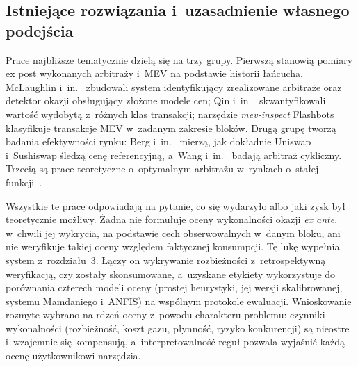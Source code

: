 \subsection{Istniejące rozwiązania i~uzasadnienie własnego podejścia}

Prace najbliższe tematycznie dzielą się na trzy grupy. Pierwszą stanowią pomiary ex post
wykonanych arbitraży i~MEV na podstawie historii łańcucha. McLaughlin
i~in.~\cite{mclaughlin_arbitrage} zbudowali system identyfikujący zrealizowane arbitraże oraz
detektor okazji obsługujący złożone modele cen; Qin i~in.~\cite{qin_bev} skwantyfikowali wartość
wydobytą z~różnych klas transakcji; narzędzie \emph{mev-inspect} Flashbots~\cite{mev_inspect}
klasyfikuje transakcje MEV w~zadanym zakresie bloków. Drugą grupę tworzą badania efektywności
rynku: Berg i~in.~\cite{berg_inefficiencies} mierzą, jak dokładnie Uniswap i~Sushiswap śledzą cenę
referencyjną, a~Wang i~in.~\cite{wang_cyclic_arbitrage} badają arbitraż cykliczny. Trzecią są
prace teoretyczne o~optymalnym arbitrażu w~rynkach o~stałej funkcji~\cite{angeris_uniswap}.

Wszystkie te prace odpowiadają na pytanie, co się wydarzyło albo jaki zysk był teoretycznie
możliwy. Żadna nie formułuje oceny wykonalności okazji \emph{ex ante}, w~chwili jej wykrycia, na
podstawie cech obserwowalnych w~danym bloku, ani nie weryfikuje takiej oceny względem
faktycznej konsumpcji. Tę lukę wypełnia system z~rozdziału~3. Łączy on wykrywanie rozbieżności
z~retrospektywną weryfikacją, czy zostały skonsumowane, a~uzyskane etykiety wykorzystuje do
porównania czterech modeli oceny (prostej heurystyki, jej wersji skalibrowanej, systemu Mamdaniego
i~ANFIS) na wspólnym protokole ewaluacji. Wnioskowanie rozmyte wybrano na rdzeń oceny z~powodu
charakteru problemu: czynniki wykonalności (rozbieżność, koszt gazu, płynność, ryzyko
konkurencji) są nieostre i~wzajemnie się kompensują, a~interpretowalność reguł pozwala wyjaśnić
każdą ocenę użytkownikowi narzędzia.
